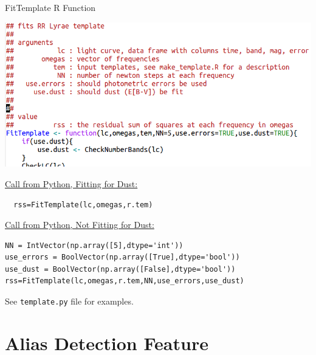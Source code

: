\documentclass[12pt]{beamer}
\begin{document}
\begin{frame}[fragile]{FitTemplate R Function}

  \begin{center}
    \includegraphics[scale=0.2]{figs/FitTemplate.png}
  \end{center}

  \underline{Call from Python, Fitting for Dust:}


\begin{verbatim}
  rss=FitTemplate(lc,omegas,r.tem)
\end{verbatim}


  \underline{Call from Python, Not Fitting for Dust:}  \\
  
\begin{verbatim}
NN = IntVector(np.array([5],dtype='int'))
use_errors = BoolVector(np.array([True],dtype='bool'))
use_dust = BoolVector(np.array([False],dtype='bool'))
rss=FitTemplate(lc,omegas,r.tem,NN,use_errors,use_dust)
\end{verbatim}

  
\vspace{.1in}
  
See \texttt{template.py} file for examples.
  
\end{frame}


\section{Alias Detection Feature}
\end{document}

